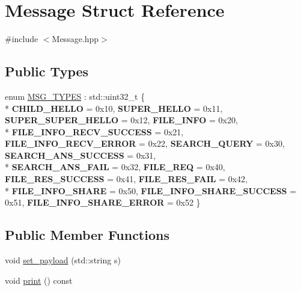 \hypertarget{structMessage}{}\section{Message Struct Reference}
\label{structMessage}


{\ttfamily \#include $<$Message.\+hpp$>$}

\subsection*{Public Types}
\begin{DoxyCompactItemize}
\item 
enum \hyperlink{structMessage_a2cd191f475dd51cf44f57950e8862cd3}{M\+S\+G\+\_\+\+T\+Y\+P\+ES} \+: std\+::uint32\+\_\+t \{ \\*
{\bfseries C\+H\+I\+L\+D\+\_\+\+H\+E\+L\+LO} = 0x10, 
{\bfseries S\+U\+P\+E\+R\+\_\+\+H\+E\+L\+LO} = 0x11, 
{\bfseries S\+U\+P\+E\+R\+\_\+\+S\+U\+P\+E\+R\+\_\+\+H\+E\+L\+LO} = 0x12, 
{\bfseries F\+I\+L\+E\+\_\+\+I\+N\+FO} = 0x20, 
\\*
{\bfseries F\+I\+L\+E\+\_\+\+I\+N\+F\+O\+\_\+\+R\+E\+C\+V\+\_\+\+S\+U\+C\+C\+E\+SS} = 0x21, 
{\bfseries F\+I\+L\+E\+\_\+\+I\+N\+F\+O\+\_\+\+R\+E\+C\+V\+\_\+\+E\+R\+R\+OR} = 0x22, 
{\bfseries S\+E\+A\+R\+C\+H\+\_\+\+Q\+U\+E\+RY} = 0x30, 
{\bfseries S\+E\+A\+R\+C\+H\+\_\+\+A\+N\+S\+\_\+\+S\+U\+C\+C\+E\+SS} = 0x31, 
\\*
{\bfseries S\+E\+A\+R\+C\+H\+\_\+\+A\+N\+S\+\_\+\+F\+A\+IL} = 0x32, 
{\bfseries F\+I\+L\+E\+\_\+\+R\+EQ} = 0x40, 
{\bfseries F\+I\+L\+E\+\_\+\+R\+E\+S\+\_\+\+S\+U\+C\+C\+E\+SS} = 0x41, 
{\bfseries F\+I\+L\+E\+\_\+\+R\+E\+S\+\_\+\+F\+A\+IL} = 0x42, 
\\*
{\bfseries F\+I\+L\+E\+\_\+\+I\+N\+F\+O\+\_\+\+S\+H\+A\+RE} = 0x50, 
{\bfseries F\+I\+L\+E\+\_\+\+I\+N\+F\+O\+\_\+\+S\+H\+A\+R\+E\+\_\+\+S\+U\+C\+C\+E\+SS} = 0x51, 
{\bfseries F\+I\+L\+E\+\_\+\+I\+N\+F\+O\+\_\+\+S\+H\+A\+R\+E\+\_\+\+E\+R\+R\+OR} = 0x52
 \}
\end{DoxyCompactItemize}
\subsection*{Public Member Functions}
\begin{DoxyCompactItemize}
\item 
void \hyperlink{structMessage_a8c71bc14df10d1bc4a11c9912ec83e11}{set\+\_\+payload} (std\+::string s)
\item 
void \hyperlink{structMessage_a2967b7c13fd34ea7767b6e00076b3e76}{print} () const 
\end{DoxyCompactItemize}

